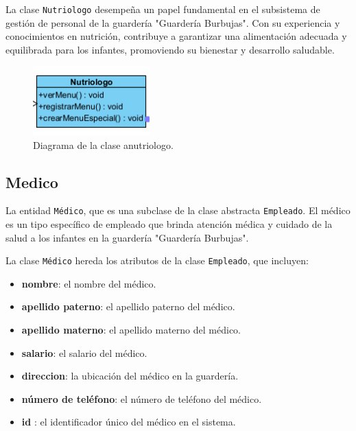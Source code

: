 La clase \texttt{Nutriologo} desempeña un papel fundamental en el subsistema de gestión de personal de la guardería "Guardería Burbujas". Con su experiencia y conocimientos en nutrición, contribuye a garantizar una alimentación adecuada y equilibrada para los infantes, promoviendo su bienestar y desarrollo saludable.


\begin{figure}[htbp]
\centering
\includegraphics[width=0.4\textwidth]{images/arqui/nutriologo.png}
\caption{Diagrama de la clase anutriologo.}
\label{fig:entidadNutriologo}
\end{figure}

\clearpage
\subsection{Medico}

La entidad \texttt{Médico}, que es una subclase de la clase abstracta \texttt{Empleado}. El médico es un tipo específico de empleado que brinda atención médica y cuidado de la salud a los infantes en la guardería "Guardería Burbujas".

La clase \texttt{Médico} hereda los atributos de la clase \texttt{Empleado}, que incluyen:

\begin{itemize}
\item \textbf{nombre}: el nombre del médico.
\item \textbf{apellido paterno}: el apellido paterno del médico.
\item \textbf{apellido materno}: el apellido materno del médico.

\item \textbf{salario}: el salario del médico.
\item \textbf{direccion}: la ubicación del médico en la guardería.

\item \textbf{número de teléfono}: el número de teléfono del médico.
\item \textbf{id }: el identificador único del médico en el sistema.
\end{itemize}

